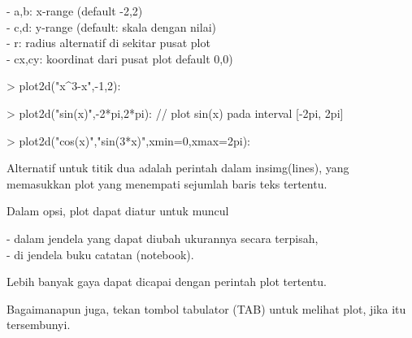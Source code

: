 \documentclass{report}
\begin{document}
\begin{eulernotebook}
\begin{eulercomment}
\begin{eulercomment}
\begin{eulercomment}
\begin{eulercomment}
\begin{eulercomment}
- a,b: x-range (default -2,2)\\
- c,d: y-range (default: skala dengan nilai)\\
- r: radius alternatif di sekitar pusat plot\\
- cx,cy: koordinat dari pusat plot default 0,0)
\end{eulercomment}
\begin{eulerprompt}
> plot2d("x^3-x",-1,2):
\end{eulerprompt}
\begin{eulerprompt}
> plot2d("sin(x)",-2*pi,2*pi): // plot sin(x) pada interval [-2pi, 2pi]
\end{eulerprompt}
\begin{eulerprompt}
> plot2d("cos(x)","sin(3*x)",xmin=0,xmax=2pi):
\end{eulerprompt}
\begin{eulercomment}
Alternatif untuk titik dua adalah perintah dalam insimg(lines), yang
memasukkan plot yang menempati sejumlah baris teks tertentu.

Dalam opsi, plot dapat diatur untuk muncul

- dalam jendela yang dapat diubah ukurannya secara terpisah,\\
- di jendela buku catatan (notebook).

Lebih banyak gaya dapat dicapai dengan perintah plot tertentu.

Bagaimanapun juga, tekan tombol tabulator (TAB) untuk melihat plot,
jika itu tersembunyi.


\end{eulercomment}
\end{eulercomment}
\end{eulercomment}
\end{eulercomment}
\end{eulercomment}
\end{eulernotebook}
\end{document}
